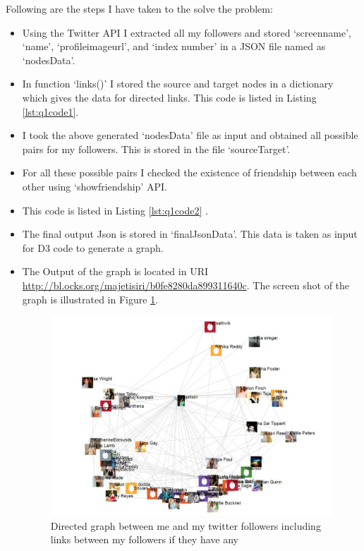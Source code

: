 Following are the steps I have taken to the solve the problem:
\begin{itemize}
\item Using the Twitter API I extracted all my followers and stored `screen\textunderscore name', `name', `profile\textunderscore image\textunderscore url', and `index number' in a JSON file named as `nodesData'.
\item In function `links()' I stored the source and target nodes in a dictionary which gives the data for directed links. This code is listed in Listing \ref{lst:q1code1}.
\item I took the above generated `nodesData' file as input and obtained all possible pairs for my followers. This is stored in the file `sourceTarget'. 
\item For all these possible pairs I checked the existence of friendship between each other using `show\textunderscore friendship' API. 
\item This code is listed in Listing \ref{lst:q1code2} .
\item The final output Json is stored in `finalJsonData'. This data is taken as input for D3 code to generate a graph.
\newpage
\item The Output of the graph is located in URI \url {http://bl.ocks.org/majetisiri/b0fe8280da899311640c}. The screen shot of the graph is illustrated in Figure \ref{fig:q1fig2}.
\begin{figure}[h!]
\begin{center}
\hspace*{-3cm} 
\includegraphics[scale=0.55, keepaspectratio=true]{figures/1.JPG}
\caption{Directed graph between me and my twitter followers including links between my followers if they have any}
\label{fig:q1fig2}
\end{center}
\end{figure}
\end{itemize}


